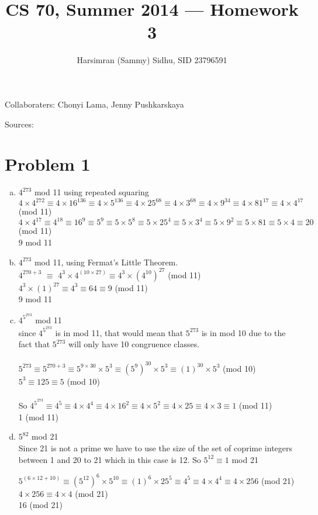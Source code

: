 \documentclass[11pt,letterpaper]{article}
\title{CS 70, Summer 2014 --- Homework 3} %
\author{Harsimran (Sammy) Sidhu, SID 23796591} %
\begin{document}
\maketitle

Collaboraters: Chonyi Lama, Jenny Pushkarskaya

Sources: 

\section*{Problem 1} %

\begin{enumerate}[(a)]
\item
$4^{273}$ mod 11 using repeated squaring\\
$4\times4^{272} \equiv 4\times16^{136} \equiv 4\times5^{136}
\equiv 4\times 25^{68} \equiv 4\times3^{68}\equiv 4\times9^{34}\equiv4\times81^{17}\equiv 4\times4^{17}$ (mod 11)\\
$4\times4^{17}\equiv 4^{18}\equiv 16^{9} \equiv 5^{9} \equiv 5\times5^{8} \equiv 5\times25^{4}\equiv 5\times3^{4} \equiv 5\times 9^{2} \equiv 5\times81 \equiv 5\times4\equiv 20$ (mod 11)\\$9$ mod 11\\

\item
$4^{273}$ mod 11, using Fermat's Little Theorem.\\
$4^{270+3}$ $\equiv$ $4^{3}\times 4^{(10\times27)}\equiv 4^{3}\times (4^{10})^{27}$ (mod 11)\\
$4^{3}\times (1)^{27}\equiv 4^{3} \equiv 64\equiv 9$ (mod 11)\\
9 mod 11\\
\item
$4^{5^{273}}$ mod 11\\
since $4^{5^{273}}$ is in mod 11, that would mean that $5^{273}$ is in mod 10 due to the fact that $5^{273}$ will only have 10 congruence classes.\\
\\
$5^{273} \equiv 5^{270+3}\equiv 5^{9\times30}\times5^{3}\equiv (5^9)^{30}\times 5^{3}\equiv 
(1)^{30}\times 5^{3}$ (mod 10)\\
$5^{3}\equiv 125\equiv 5$ (mod 10)\\
\\
So $4^{5^{273}}\equiv 4^5\equiv 4\times4^4\equiv 4\times16^2\equiv 4\times 5^2\equiv 4\times 25\equiv 4\times 3\equiv 1$ (mod 11)\\
1 (mod 11)
\item
$5^{82}$ mod 21\\
Since 21 is not a prime we have to use the size of the set of coprime integers between 1 and 20 to 21 which in this case is 12. So $5^{12}\equiv 1$ mod 21

$5^{(6\times 12 + 10)} \equiv (5^{12})^6 \times 5^{10}\equiv (1)^6 \times 25^5 \equiv 4^5\equiv 4\times4^4\equiv4\times256$ (mod 21)\\
$4\times256\equiv 4\times 4$ (mod 21)\\
16 (mod 21)
\end{enumerate}
\clearpage
\end{document}
